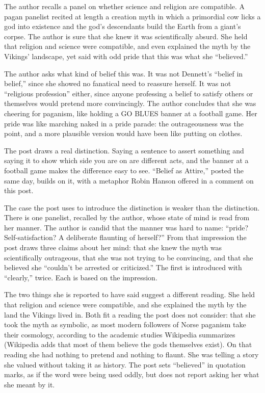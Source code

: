 \begin{afterword}
\summaryhead

The author recalls a panel on whether science and religion are compatible. A pagan panelist recited at length a creation myth in which a primordial cow licks a god into existence and the god's descendants build the Earth from a giant's corpse. The author is sure that she knew it was scientifically absurd. She held that religion and science were compatible, and even explained the myth by the Vikings' landscape, yet said with odd pride that this was what she ``believed.''

The author asks what kind of belief this was. It was not Dennett's ``belief in belief,'' since she showed no fanatical need to reassure herself. It was not ``religious profession'' either, since anyone professing a belief to satisfy others or themselves would pretend more convincingly. The author concludes that she was cheering for paganism, like holding a GO BLUES banner at a football game. Her pride was like marching naked in a pride parade: the outrageousness was the point, and a more plausible version would have been like putting on clothes.

\responsehead

The post draws a real distinction. Saying a sentence to assert something and saying it to show which side you are on are different acts, and the banner at a football game makes the difference easy to see. ``Belief as Attire,'' posted the same day, builds on it, with a metaphor Robin Hanson offered in a comment on this post.

The case the post uses to introduce the distinction is weaker than the distinction. There is one panelist, recalled by the author, whose state of mind is read from her manner. The author is candid that the manner was hard to name: ``pride? Self-satisfaction? A deliberate flaunting of herself?'' From that impression the post draws three claims about her mind: that she knew the myth was scientifically outrageous, that she was not trying to be convincing, and that she believed she ``couldn't be arrested or criticized.'' The first is introduced with ``clearly,'' twice. Each is based on the impression.

The two things she is reported to have said suggest a different reading. She held that religion and science were compatible, and she explained the myth by the land the Vikings lived in. Both fit a reading the post does not consider: that she took the myth as symbolic, as most modern followers of Norse paganism take their cosmology, according to the academic studies Wikipedia summarizes (Wikipedia adds that most of them believe the gods themselves exist). On that reading she had nothing to pretend and nothing to flaunt. She was telling a story she valued without taking it as history. The post sets ``believed'' in quotation marks, as if the word were being used oddly, but does not report asking her what she meant by it.


\end{afterword}
